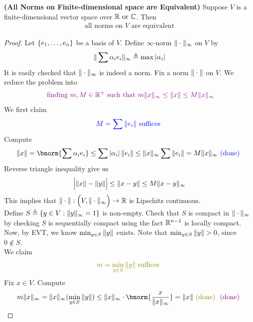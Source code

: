 \documentclass{report}
\begin{document}
\begin{theorem}
\label{ANoF}
\textbf{(All Norms on Finite-dimensional space are Equivalent)} Suppose $V$ is a finite-dimensional vector space over $\mathbb{R}\text{ or }\mathbb{C}$. Then 
\begin{align*}
\text{ all norms on $V$ are equivalent }
\end{align*}
\end{theorem}
\begin{proof}
Let $\{ e_1,\dots ,e_n \}$ be a basis of $V$. Define $\infty$-norm $\| \cdot \|_\infty$ on $V$ by 
\begin{align*}
\| \sum \alpha_i e_i \|_{\infty}\triangleq  \max \left|\alpha_i\right| 
\end{align*}
It is easily checked that $\| \cdot \|_\infty$ is indeed a norm. Fix a norm $\| \cdot \|$ on $V$. We reduce the problem into  
\begin{align*}
  \textcolor{violet}{\text{ finding $m,M\in\mathbb{R}^+$ such that }m\| x \|_\infty \leq \| x \|\leq M\| x \|_\infty}
\end{align*}
We first claim 
\begin{align*}
\textcolor{blue}{M=\sum \| e_i \|\text{ suffices }}
\end{align*}
Compute 
\begin{align*}
\norm{x}= \bnorm{\sum \alpha_ie_i} \leq \sum \abso{\alpha _i} \norm{e_i} \leq \norm{x}_\infty \sum \norm{e_i}= M \norm{x}_\infty \bdone
\end{align*}
Reverse triangle inequality give us 
\begin{align*}
\Big|\| x \|-\| y \|\Big|\leq \| x-y \| \leq M \| x-y \|_\infty
\end{align*}
This implies that $\| \cdot \|:\Big(V,\| \cdot \|_\infty \Big)\rightarrow \mathbb{R}$ is Lipschitz continuous.\\


 
Define $S\triangleq \{ y \in V: \| y \|_\infty =1 \}$ is non-empty. Check that $S$ is compact in $\| \cdot \|_\infty$ by checking  $S$ is sequentially compact using the fact $\mathbb{R}^{n-1}$ is locally compact.\\


Now, by EVT, we know $\min _{y \in S}\| y \|$ exists. Note that $\min_{y \in S}\norm{y}>0$, since $0 \not\in S$.\\ 

We claim 
\begin{align*}
  \olive{m= \min_{y \in S}\norm{y}\text{ suffices }}
\end{align*}
Fix $x \in V$. Compute 
\begin{align*}
m\norm{x}_\infty = \norm{x}_\infty (\min_{y \in S} \norm{y})\leq \norm{x}_\infty \cdot  \bnorm{ \frac{x}{\norm{x}_\infty}}=\norm{x}\odone \vdone
\end{align*}






\end{proof}
\end{document}
